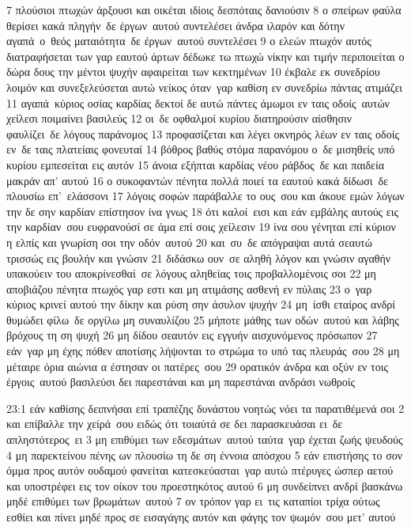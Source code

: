 \documentclass[10pt,oneside,footinclude=true,headinclude=true]{scrbook} %
\begin{document}
7 πλούσιοι πτωχών άρξουσι και οικέται ιδίοις δεσπόταις δανιούσιν
8 ο σπείρων φαύλα θερίσει κακά πληγήν δε έργων αυτού συντελέσει άνδρα ιλαρόν και δότην αγαπά ο θεός ματαιότητα δε έργων αυτού συντελέσει
9 ο ελεών πτωχόν αυτός διατραφήσεται των γαρ εαυτού άρτων δέδωκε τω πτωχώ νίκην και τιμήν περιποιείται ο δώρα δους την μέντοι ψυχήν αφαιρείται των κεκτημένων
10 έκβαλε εκ συνεδρίου λοιμόν και συνεξελεύσεται αυτώ νείκος όταν γαρ καθίση εν συνεδρίω πάντας ατιμάζει
11 αγαπά κύριος οσίας καρδίας δεκτοί δε αυτώ πάντες άμωμοι εν ταις οδοίς αυτών χείλεσι ποιμαίνει βασιλεύς
12 οι δε οφθαλμοί κυρίου διατηρούσιν αίσθησιν φαυλίζει δε λόγους παράνομος
13 προφασίζεται και λέγει οκνηρός λέων εν ταις οδοίς εν δε ταις πλατείαις φονευταί
14 βόθρος βαθύς στόμα παρανόμου ο δε μισηθείς υπό κυρίου εμπεσείται εις αυτόν
15 άνοια εξήπται καρδίας νέου ράβδος δε και παιδεία μακράν απ' αυτού
16 ο συκοφαντών πένητα πολλά ποιεί τα εαυτού κακά δίδωσι δε πλουσίω επ' ελάσσονι
17 λόγοις σοφών παράβαλλε το ους σου και άκουε εμών λόγων την δε σην καρδίαν επίστησον ίνα γνως
18 ότι καλοί εισι και εάν εμβάλης αυτούς εις την καρδίαν σου ευφρανούσί σε άμα επί σοις χείλεσιν
19 ίνα σου γένηται επί κύριον η ελπίς και γνωρίση σοι την οδόν αυτού
20 και συ δε απόγραψαι αυτά σεαυτώ τρισσώς εις βουλήν και γνώσιν
21 διδάσκω ουν σε αληθή λόγον και γνώσιν αγαθήν υπακούειν του αποκρίνεσθαί σε λόγους αληθείας τοις προβαλλομένοις σοι
22 μη αποβιάζου πένητα πτωχός γαρ εστι και μη ατιμάσης ασθενή εν πύλαις
23 ο γαρ κύριος κρινεί αυτού την δίκην και ρύση σην άσυλον ψυχήν
24 μη ίσθι εταίρος ανδρί θυμώδει φίλω δε οργίλω μη συναυλίζου
25 μήποτε μάθης των οδών αυτού και λάβης βρόχους τη ση ψυχή
26 μη δίδου σεαυτόν εις εγγυήν αισχυνόμενος πρόσωπον
27 εάν γαρ μη έχης πόθεν αποτίσης λήψονται το στρώμα το υπό τας πλευράς σου
28 μη μέταιρε όρια αιώνια α έστησαν οι πατέρες σου
29 ορατικόν άνδρα και οξύν εν τοις έργοις αυτού βασιλεύσι δει παρεστάναι και μη παρεστάναι ανδράσι νωθροίς
\par
23:1 εάν καθίσης δειπνήσαι επί τραπέζης δυνάστου νοητώς νόει τα παρατιθέμενά σοι
2 και επίβαλλε την χείρά σου ειδώς ότι τοιαύτά σε δει παρασκευάσαι ει δε απληστότερος ει
3 μη επιθύμει των εδεσμάτων αυτού ταύτα γαρ έχεται ζωής ψευδούς
4 μη παρεκτείνου πένης ων πλουσίω τη δε ση έννοια απόσχου
5 εάν επιστήσης το σον όμμα προς αυτόν ουδαμού φανείται κατεσκεύασται γαρ αυτώ πτέρυγες ώσπερ αετού και υποστρέφει εις τον οίκον του προεστηκότος αυτού
6 μη συνδείπνει ανδρί βασκάνω μηδέ επιθύμει των βρωμάτων αυτού
7 ον τρόπον γαρ ει τις καταπίοι τρίχα ούτως εσθίει και πίνει μηδέ προς σε εισαγάγης αυτόν και φάγης τον ψωμόν σου μετ' αυτού
\end{document}
